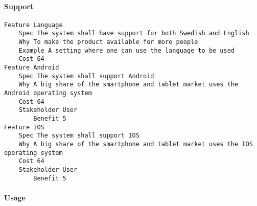 				
			 \paragraph{Support}


\begin{lstlisting}
Feature Language
	Spec The system shall have support for both Swedish and English
	Why To make the product available for more people
	Example A setting where one can use the language to be used
	Cost 64
Feature Android
	Spec The system shall support Android
	Why A big share of the smartphone and tablet market uses the Android operating system
	Cost 64
	Stakeholder User
		Benefit 5
Feature IOS
	Spec The system shall support IOS
	Why A big share of the smartphone and tablet market uses the IOS operating system
	Cost 64
	Stakeholder User
		Benefit 5

\end{lstlisting}
		
				
			 \paragraph{Usage}


